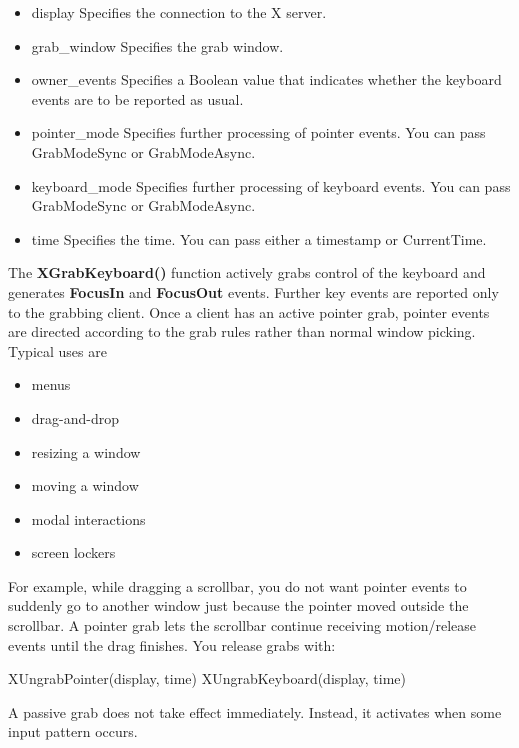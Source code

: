 \documentclass{report}
\begin{document}
\begin{itemize}
\begin{itemize}
                \item display	Specifies the connection to the X server.
                \item grab\_window	Specifies the grab window.
                \item owner\_events	Specifies a Boolean value that indicates whether the keyboard events are to be reported as usual.
                \item pointer\_mode	Specifies further processing of pointer events. You can pass GrabModeSync or GrabModeAsync.
                \item keyboard\_mode	Specifies further processing of keyboard events. You can pass GrabModeSync or GrabModeAsync.
                \item time	Specifies the time. You can pass either a timestamp or CurrentTime.
            \end{itemize}
            The \textbf{XGrabKeyboard()} function actively grabs control of the keyboard and generates \textbf{FocusIn} and \textbf{FocusOut} events. Further key events are reported only to the grabbing client.
            \bigbreak \noindent 
            Once a client has an active pointer grab, pointer events are directed according to the grab rules rather than normal window picking. Typical uses are
            \begin{itemize}
                \item menus
                \item drag-and-drop
                \item resizing a window
                \item moving a window
                \item modal interactions
                \item screen lockers
            \end{itemize}
            For example, while dragging a scrollbar, you do not want pointer events to suddenly go to another window just because the pointer moved outside the scrollbar. A pointer grab lets the scrollbar continue receiving motion/release events until the drag finishes.
            \bigbreak \noindent 
            You release grabs with:
            \bigbreak \noindent 
            \begin{cppcode}
            XUngrabPointer(display, time)
            XUngrabKeyboard(display, time)
            \end{cppcode}
            \bigbreak \noindent 
            A passive grab does not take effect immediately. Instead, it activates when some input pattern occurs.

\end{itemize}
\end{document}
